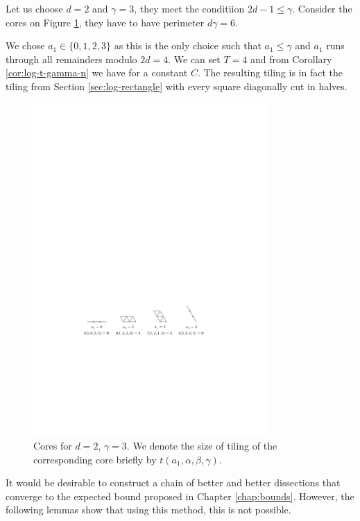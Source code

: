 \begin{exmp}
Let us choose $d=2$ and $\gamma=3$, they meet the conditiion $2d-1 \leq \gamma$. Consider the cores on Figure \ref{fig:core-kk3}, they have to have perimeter $d\gamma = 6$.

We chose $a_1 \in \{0,1,2,3\}$ as this is the only choice such that $a_1 \leq \gamma$ and $a_1$ runs through all remainders modulo $2d=4$. We can set $T=4$ and from Corollary \ref{cor:log-t-gamma-n} we have
%
for a constant $C$. The resulting tiling is in fact the tiling from Section \ref{sec:log-rectangle}  with every square diagonally cut in halves.

\begin{figure}[htb]
\centering
\includegraphics[width=0.8\textwidth]{img/example_core_kk3.pdf}
\caption{Cores for $d=2$, $\gamma=3$. We denote the size of tiling of the corresponding core briefly by $t(a_1,\alpha,\beta,\gamma)$.}
\label{fig:core-kk3}
\end{figure}
\end{exmp}%

It would be desirable to construct a chain of better and better dissections that converge to the expected bound proposed in Chapter \ref{chap:bounds}. However, the following lemmas show that using this method, this is not possible.

